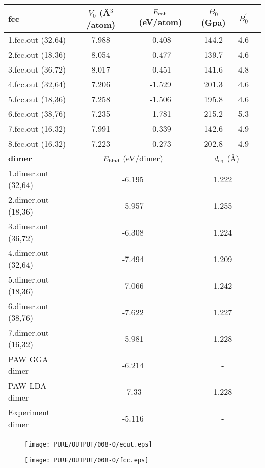 \documentclass[onecolumn]{revtex4}
\begin{document}
\begin{center}
\begin{tabular}{lccccc}
\hline
\hline
\bf{fcc}&$V_0$ (\AA$^3$/atom)&$E_{\rm coh}$ (eV/atom)&$B_0$ (Gpa)&$B_0^{'}$& \\
\hline
1.fcc.out (32,64)& 7.988 &-0.408 & 144.2 & 4.6 & \\ 
2.fcc.out (18,36)& 8.054 &-0.477 & 139.7 & 4.6 & \\ 
3.fcc.out (36,72)& 8.017 &-0.451 & 141.6 & 4.8 & \\ 
4.fcc.out (32,64)& 7.206 &-1.529 & 201.3 & 4.6 & \\ 
5.fcc.out (18,36)& 7.258 &-1.506 & 195.8 & 4.6 & \\ 
6.fcc.out (38,76)& 7.235 &-1.781 & 215.2 & 5.3 & \\ 
7.fcc.out (16,32)& 7.991 &-0.339 & 142.6 & 4.9 & \\ 
8.fcc.out (16,32)& 7.223 &-0.273 & 202.8 & 4.9 & \\ 
\hline
\hline
\bf{dimer}&\multicolumn{2}{c}{$E_{\rm bind}$ (eV/dimer)}&\multicolumn{3}{c}{$d_{\rm eq}$ (\AA)} \\
\hline
1.dimer.out (32,64)&\multicolumn{2}{c}{-6.195}&\multicolumn{2}{c}{1.222} \\ 
2.dimer.out (18,36)&\multicolumn{2}{c}{-5.957}&\multicolumn{2}{c}{1.255} \\ 
3.dimer.out (36,72)&\multicolumn{2}{c}{-6.308}&\multicolumn{2}{c}{1.224} \\ 
4.dimer.out (32,64)&\multicolumn{2}{c}{-7.494}&\multicolumn{2}{c}{1.209} \\ 
5.dimer.out (18,36)&\multicolumn{2}{c}{-7.066}&\multicolumn{2}{c}{1.242} \\ 
6.dimer.out (38,76)&\multicolumn{2}{c}{-7.622}&\multicolumn{2}{c}{1.227} \\ 
7.dimer.out (16,32)&\multicolumn{2}{c}{-5.981}&\multicolumn{2}{c}{1.228} \\ 
PAW GGA dimer~\cite{Paier_JCP122_2005} & \multicolumn{2}{c}{-6.214} & \multicolumn{2}{c}{-} \\ %
PAW LDA dimer~\cite{Blochl_PRB50_1994} & \multicolumn{2}{c}{-7.33} & \multicolumn{2}{c}{1.228} \\ %
Experiment dimer~\cite{Paier_JCP122_2005} & \multicolumn{2}{c}{-5.116} & \multicolumn{2}{c}{-} \\ %
\hline
\hline
\end{tabular}
\end{center}
\begin{figure}[h] 
\centering 
\texttt{[image: PURE/OUTPUT/008-O/ecut.eps]}
\end{figure}
\begin{figure}[h] 
\centering 
\texttt{[image: PURE/OUTPUT/008-O/fcc.eps]}
\end{figure}
\newpage
\end{document}
